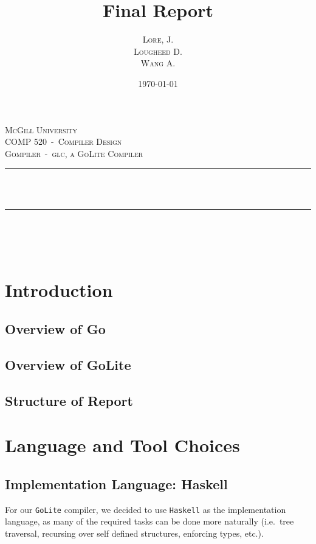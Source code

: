 \documentclass[11pt]{article}
\author{\textsc{Lore}, J.\\ \textsc{Lougheed} D.\\ \textsc{Wang} A.}
\date{\today}
\title{Final Report}
\newcommand{\HRule}{\rule{\linewidth}{0.5mm}}
\begin{document}
\begin{titlepage}
	\center%

	\textsc{\LARGE McGill University}\\[1.5cm]
	\textsc{\Large COMP 520~-~Compiler Design}\\[0.5cm]
	\textsc{\large Gompiler~-~glc, a GoLite Compiler}\\[0.5cm]

	\HRule~\\[0.4cm]
	{ \huge \bfseries \thetitle}\\[0.4cm]
	\HRule~\\[1.5cm]

	\theauthor\\%
	[3cm]

	{\large \thedate}\\[2cm]

	\vfill

\end{titlepage}
\tableofcontents
\newpage
\section{Introduction}
\subsection{Overview of Go}
\subsection{Overview of GoLite}
\subsection{Structure of Report}
\section{Language and Tool Choices}
\subsection{Implementation Language: Haskell}
For our \texttt{GoLite} compiler, we decided to use \texttt{Haskell} as the
implementation language, as many of the required tasks can be done
more naturally (i.e.\ tree traversal, recursing over self defined
structures, enforcing types, etc.).
\end{document}
